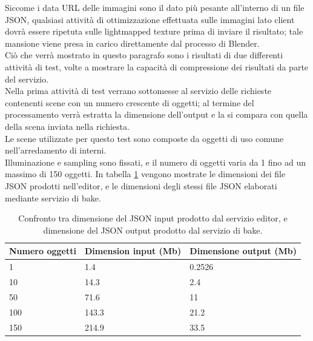 Siccome i data URL delle immagini sono il dato più pesante all’interno di un file JSON, qualsiasi attività di ottimizzazione effettuata sulle immagini lato client dovrà essere ripetuta sulle lightmapped texture prima di inviare il risultato; tale mansione viene presa in carico direttamente dal processo di Blender.
\\
Ciò che verrà mostrato in questo paragrafo sono i risultati di due differenti attività di test, volte a mostrare la capacità di compressione dei risultati da parte del servizio. 
\\
Nella prima attività di test verrano sottomesse al servizio delle richieste contenenti scene con un numero crescente di oggetti; al termine del processamento verrà estratta la dimensione dell’output e la si compara con quella della scena inviata nella richiesta. 
\\
Le scene utilizzate per questo test sono composte da oggetti di uso comune nell’arredamento di interni. 
\\
Illuminazione e sampling sono fissati, e il numero di oggetti varia da 1 fino ad un massimo di 150 oggetti. In tabella \ref{table:dim_obj} vengono mostrate le dimensioni dei file JSON prodotti nell'editor, e le dimensioni degli stessi file JSON elaborati mediante servizio di bake.

\begin{table}[]
\centering
\caption[Confronto dimensioni input-output]{Confronto tra dimensione del JSON input prodotto dal servizio editor, e dimensione del JSON output prodotto dal servizio di bake.}
\begin{tabular}{|l|l|l|}
\hline
\textbf{Numero oggetti} & \textbf{Dimension input (Mb)} & \textbf{Dimensione output (Mb)} \\ \hline
1 & 1.4 & 0.2526 \\ \hline
10 & 14.3 & 2.4 \\ \hline
50 & 71.6 & 11 \\ \hline
100 & 143.3 & 21.2 \\ \hline
150 & 214.9 & 33.5 \\ \hline
\end{tabular}
\label{table:dim_obj}
\end{table}

